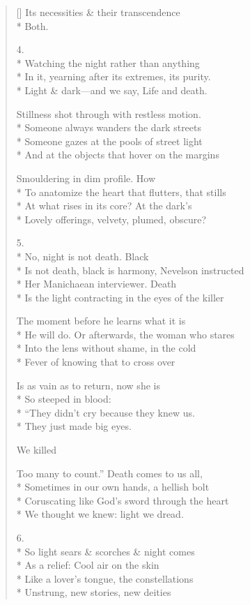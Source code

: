 \begin{verse}[\versewidth]
Its necessities \& their transcendence\\*
Both.

4.\\*
\qquad Watching the night rather than anything\\*
In it, yearning after its extremes, its purity.\\*
Light \& dark---and we say, Life and death.

Stillness shot through with restless motion.\\*
Someone always wanders the dark streets\\*
Someone gazes at the pools of street light\\*
And at the objects that hover on the margins

Smouldering in dim profile. How\\*
To anatomize the heart that flutters, that stills\\*
At what rises in its core? At the dark's\\*
Lovely offerings, velvety, plumed, obscure?

5.\\*
No, night is not death. Black\\*
Is not death, black is harmony, Nevelson instructed \\*
Her Manichaean interviewer. Death\\*
Is the light contracting in the eyes of the killer

The moment before he learns what it is\\*
He will do. Or afterwards, the woman who stares\\*
Into the lens without shame, in the cold\\*
Fever of knowing that to cross over

Is as vain as to return, now she is\\*
So steeped in blood:\\*
``They didn't cry because they knew us.\\*
They just made big eyes.

We killed

Too many to count.'' Death comes to us all,\\*
Sometimes in our own hands, a hellish bolt\\*
Coruscating like God's sword through the heart\\*
We thought we knew: light we dread.

6.\\*
So light sears \& scorches \& night comes\\*
As a relief: Cool air on the skin\\*
Like a lover's tongue, the constellations\\*
Unstrung, new stories, new deities


\end{verse}
